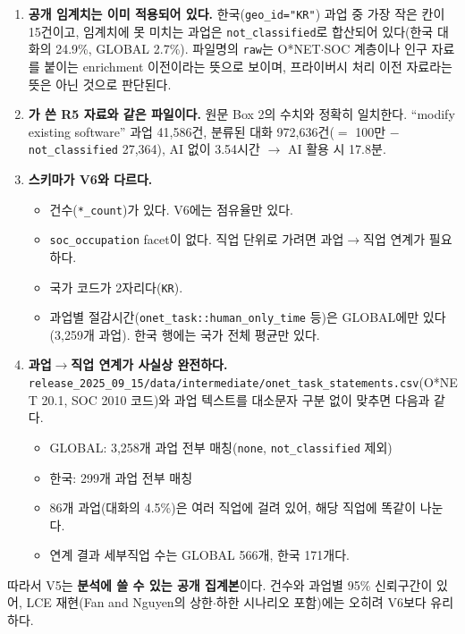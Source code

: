 \documentclass[11pt]{article}
\begin{document}
\begin{enumerate}[label=(\arabic*)]
  \item \textbf{공개 임계치는 이미 적용되어 있다.} 한국(\texttt{geo\_id="KR"}) 과업 중 가장 작은 칸이 15건이고, 임계치에 못 미치는 과업은 \texttt{not\_classified}로 합산되어 있다(한국 대화의 24.9\%, GLOBAL 2.7\%). 파일명의 \texttt{raw}는 O*NET$\cdot$SOC 계층이나 인구 자료를 붙이는 enrichment 이전이라는 뜻으로 보이며, 프라이버시 처리 이전 자료라는 뜻은 아닌 것으로 판단된다.
  \item \textbf{\textcite{fan-2026-aggregate-gains-from-ai}가 쓴 R5 자료와 같은 파일이다.} 원문 Box 2의 수치와 정확히 일치한다. ``modify existing software'' 과업 41,586건, 분류된 대화 972,636건($=$ 100만 $-$ \texttt{not\_classified} 27,364), AI 없이 3.54시간 $\to$ AI 활용 시 17.8분.
  \item \textbf{스키마가 V6와 다르다.}
  \begin{itemize}
    \item 건수(\texttt{*\_count})가 있다. V6에는 점유율만 있다.
    \item \texttt{soc\_occupation} facet이 없다. 직업 단위로 가려면 과업$\to$직업 연계가 필요하다.
    \item 국가 코드가 2자리다(\texttt{KR}).
    \item 과업별 절감시간(\texttt{onet\_task::human\_only\_time} 등)은 GLOBAL에만 있다(3,259개 과업). 한국 행에는 국가 전체 평균만 있다.
  \end{itemize}
  \item \textbf{과업$\to$직업 연계가 사실상 완전하다.} \texttt{release\_2025\_09\_15/data/intermediate/onet\_task\_statements.csv}(O*NET 20.1, SOC 2010 코드)와 과업 텍스트를 대소문자 구분 없이 맞추면 다음과 같다.
  \begin{itemize}
    \item GLOBAL: 3,258개 과업 전부 매칭(\texttt{none}, \texttt{not\_classified} 제외)
    \item 한국: 299개 과업 전부 매칭
    \item 86개 과업(대화의 4.5\%)은 여러 직업에 걸려 있어, 해당 직업에 똑같이 나눈다.
    \item 연계 결과 세부직업 수는 GLOBAL 566개, 한국 171개다.
  \end{itemize}
\end{enumerate}

따라서 V5는 \textbf{분석에 쓸 수 있는 공개 집계본}이다. 건수와 과업별 95\% 신뢰구간이 있어, LCE 재현(Fan and Nguyen의 상한$\cdot$하한 시나리오 포함)에는 오히려 V6보다 유리하다.
\end{document}
